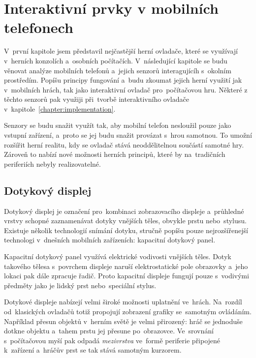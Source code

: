 \documentclass[thesis=B,czech,hidelinks]{FITthesis}[2012/06/26] %
\begin{document}
\chapter{Interaktivní prvky v mobilních telefonech}

V~první kapitole jsem představil nejčastější herní ovladače, které se využívají v~herních konzolích a~osobních počítačích. V~následující kapitole se budu věnovat analýze mobilních telefonů a~jejich senzorů interagujícíh s~okolním prostředím. Popíšu principy fungování a~budu zkoumat jejich herní využití jak v~mobilních hrách, tak jako interaktivní ovladač pro~počítačovou hru. Některé z těchto senzorů pak využiji při~tvorbě interaktivního ovladače v~kapitole~\ref{chapter:implementation}.

Senzory se budu snažit využít tak, aby mobilní telefon nesloužil pouze jako vstupní zařízení, a~proto se jej budu snažit provázat s~hrou samotnou. To umožní rozšířit herní realitu, kdy se ovladač stává neoddělitelnou součástí samotné hry. Zároveň to nabízí nové možnosti herních principů, které by na~tradičních periferiích nebyly realizovatelné.

\section{Dotykový displej}
\label{section:touchscreen}

Dotykový displej je označení pro~kombinaci zobrazovacího displeje a~průhledné vrstvy schopné zaznamenávat dotyky vnějších těles, obvykle prstu nebo~stylusu. Existuje několik technologií snímání dotyku, stručně popíšu pouze nejrozšířenejší technologi v~dnešních mobilních zařízeních: kapacitní dotykový panel.

Kapacitní dotykový panel využívá elektrické vodivosti vnějších těles. Dotyk takového tělesa s~povrchem displeje naruší elektrostatické pole obrazovky a~jeho lokaci pak dále zpracuje řadič. Proto kapacitní displeje fungují pouze s~vodivými předměty jako je lidský prst nebo~speciální stylus. \cite{gray2013does}

Dotykové displeje nabízejí velmi široké možnosti uplatnění ve~hrách. Na~rozdíl od~klasických ovladačů totiž propojují zobrazení grafiky se~samotným ovládáním. Například přesun objektů v~herním světě je velmi přirozený: hráč se jednoduše dotkne objektu a~tahem prstu jej přesune po~obrazovce. Ve~srovnání s~počítačovou myší pak odpadá \textit{mezivrstva} ve~formě periferie připojené k~zařízení a~hráčův prst se tak stává samotným kurzorem.
\end{document}
